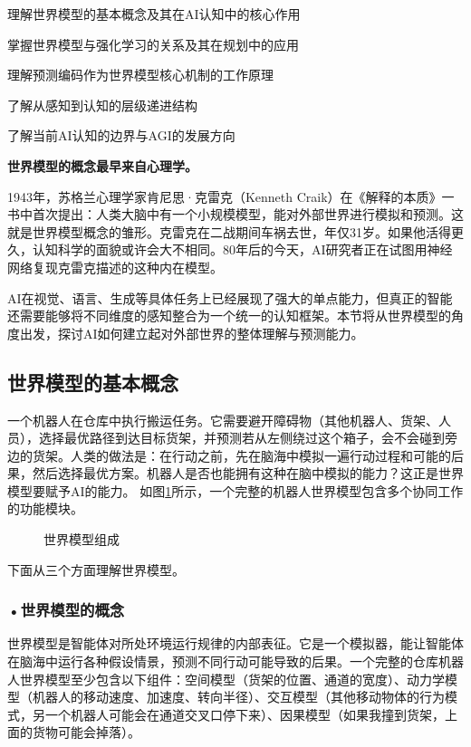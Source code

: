\begin{sectionkeypoints}
\item 理解世界模型的基本概念及其在AI认知中的核心作用
\item 掌握世界模型与强化学习的关系及其在规划中的应用
\item 理解预测编码作为世界模型核心机制的工作原理
\item 了解从感知到认知的层级递进结构
\item 了解当前AI认知的边界与AGI的发展方向
\end{sectionkeypoints}



\begin{knowledgebox}
\small
\textbf{世界模型的概念最早来自心理学。}

1943年，苏格兰心理学家肯尼思·克雷克（Kenneth Craik）在《解释的本质》一书中首次提出：人类大脑中有一个小规模模型，能对外部世界进行模拟和预测。这就是世界模型概念的雏形。克雷克在二战期间车祸去世，年仅31岁。如果他活得更久，认知科学的面貌或许会大不相同。80年后的今天，AI研究者正在试图用神经网络复现克雷克描述的这种内在模型。
\end{knowledgebox}
AI在视觉、语言、生成等具体任务上已经展现了强大的单点能力，但真正的智能还需要能够将不同维度的感知整合为一个统一的认知框架。本节将从世界模型的角度出发，探讨AI如何建立起对外部世界的整体理解与预测能力。
\subsection{世界模型的基本概念}
一个机器人在仓库中执行搬运任务。它需要避开障碍物（其他机器人、货架、人员），选择最优路径到达目标货架，并预测若从左侧绕过这个箱子，会不会碰到旁边的货架。人类的做法是：在行动之前，先在脑海中模拟一遍行动过程和可能的后果，然后选择最优方案。机器人是否也能拥有这种在脑中模拟的能力？这正是世界模型要赋予AI的能力。
如图\ref{fig:ch2_2_34}所示，一个完整的机器人世界模型包含多个协同工作的功能模块。

\begin{figure}[H]
\centering
{}
\caption{世界模型组成}
\label{fig:ch2_2_34}
\end{figure}
下面从三个方面理解世界模型。

\subsubsection*{\textbf{•世界模型的概念}}

世界模型是智能体对所处环境运行规律的内部表征。它是一个模拟器，能让智能体在脑海中运行各种假设情景，预测不同行动可能导致的后果。一个完整的仓库机器人世界模型至少包含以下组件：空间模型（货架的位置、通道的宽度）、动力学模型（机器人的移动速度、加速度、转向半径）、交互模型（其他移动物体的行为模式，另一个机器人可能会在通道交叉口停下来）、因果模型（如果我撞到货架，上面的货物可能会掉落）。

